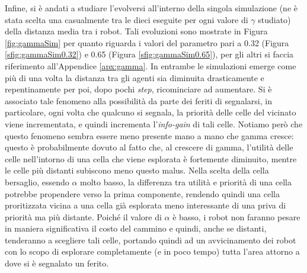 Infine, si è andati a studiare l'evolversi all'interno della singola simulazione (ne è stata scelta una casualmente tra le dieci eseguite per ogni valore di $\gamma$ studiato) della distanza media tra i robot.
Tali evoluzioni sono mostrate in Figura \ref{fig:gammaSim} per quanto riguarda i valori del parametro pari a 0.32 (Figura \ref{sfig:gammaSim0.32}) e 0.65 (Figura \ref{sfig:gammaSim0.65}), per gli altri si faccia riferimento all'Appendice \ref{apx:gamma}.
In entrambe le simulazioni emerge come più di una volta la distanza tra gli agenti sia diminuita drasticamente e repentinamente per poi, dopo pochi \textit{step}, ricominciare ad aumentare.
Si è associato tale fenomeno alla possibilità da parte dei feriti di segnalarsi, in particolare, ogni volta che qualcuno si segnala, la priorità delle celle del vicinato viene incrementata, e quindi incrementa l'\textit{info-gain} di tali celle.
Notiamo però che questo fenomeno sembra essere meno presente mano a mano che gamma cresce: questo è probabilmente dovuto al fatto che, al crescere di gamma, l'utilità delle celle nell'intorno di una cella che viene esplorata è fortemente diminuito, mentre le celle più distanti subiscono meno questo malus. Nella scelta della cella bersaglio, essendo $\alpha$ molto basso, la differenza tra utilità e priorità di una cella potrebbe propendere verso la prima componente, rendendo quindi una cella proritizzata vicina a una cella già esplorata meno interessante di una priva di priorità ma più distante.
Poiché il valore di $\alpha$ è basso, i robot non faranno pesare in maniera significativa il costo del cammino e quindi, anche se distanti, tenderanno a scegliere tali celle, portando quindi ad un avvicinamento dei robot con lo scopo di esplorare completamente (e in poco tempo) tutta l'area attorno a dove si è segnalato un ferito.
